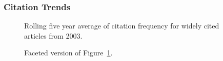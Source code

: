 \documentclass[
  10pt,
  letterpaper,
  DIV=11,
  numbers=noendperiod,
  twoside]{scrartcl}
\begin{document}
\subsubsection*{Citation Trends}\label{citation-trends-27}

\begin{figure}


\caption{\label{fig-citation-spaghetti-2003}Rolling five year average of
citation frequency for widely cited articles from 2003.}

\end{figure}%

\begin{figure}


\caption{\label{fig-citation-facet-2003}Faceted version of
Figure~\ref{fig-citation-spaghetti-2003}.}

\end{figure}%
\end{document}
